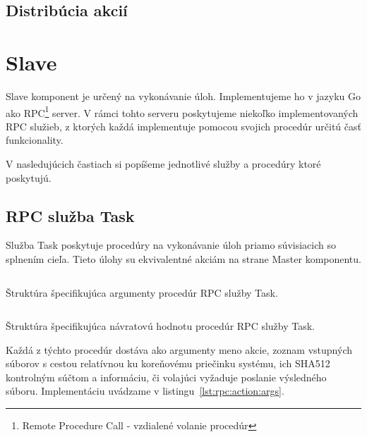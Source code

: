 \subsection{Distrib\'{u}cia akci\'{i}}
\label{sec:master:distribution}


\section{Slave}
\label{sec:slave}

Slave komponent je určený na vykonávanie úloh. Implementujeme ho v jazyku Go
ako RPC\footnote{Remote Procedure Call - vzdialené volanie procedúr} server.
V rámci tohto serveru poskytujeme niekoľko implementovaných RPC služieb,
z ktorých každá implementuje pomocou svojich procedúr určitú časť funkcionality.

V nasledujúcich častiach si popíšeme jednotlivé služby a procedúry ktoré
poskytujú.

\subsection{RPC služba Task}
\label{sec:slave:rpc:action}

Služba Task poskytuje procedúry na vykonávanie úloh priamo súvisiacich so
splnením cieľa. Tieto úlohy su ekvivalentné akciám na strane Master komponentu.

\begin{listing}[H]
  \inputminted[frame=lines,framesep=2mm,linenos,fontsize=\scriptsize,firstline=8,lastline=12]{go}{/home/pepol/src/imterra/forge/proto/proto.go}
  \caption[Argumenty služby Task]{Štruktúra špecifikujúca argumenty procedúr RPC služby Task.}
  \label{lst:rpc:action:args}
\end{listing}

\begin{listing}[H]
  \inputminted[frame=lines,framesep=2mm,linenos,fontsize=\scriptsize,firstline=14,lastline=17]{go}{/home/pepol/src/imterra/forge/proto/proto.go}
  \caption[Návratová hodnota služby Task]{Štruktúra špecifikujúca návratovú hodnotu procedúr RPC služby Task.}
  \label{lst:rpc:action:response}
\end{listing}

Každá z týchto procedúr dostáva ako argumenty meno akcie, zoznam vstupných súborov
s cestou relatívnou ku koreňovému priečinku systému, ich SHA512 kontrolným súčtom a informáciu, či volajúci
vyžaduje poslanie výsledného súboru. Implementáciu uvádzame v listingu~\ref{lst:rpc:action:args}.

